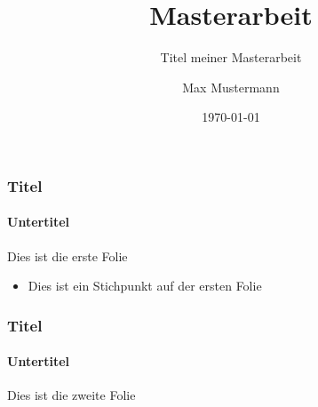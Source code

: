 \documentclass{beamer}
\title{Masterarbeit}
\subtitle{Titel meiner Masterarbeit}
\author{Max Mustermann}
\date{\today}
\institute{Hochschule Musterstadt}
\begin{document}
\begin{frame}
\frametitle{Titel}
\framesubtitle{Untertitel}
Dies ist die erste Folie
\begin{itemize}
	\item Dies ist ein Stichpunkt auf der ersten Folie
\end{itemize}
\end{frame}

\begin{frame}
\frametitle{Titel}
\framesubtitle{Untertitel}
Dies ist die zweite Folie
\end{frame}
\end{document}
